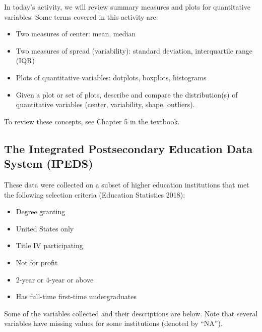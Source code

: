 \documentclass[
]{report}
\begin{document}
In today's activity, we will review summary measures and plots for quantitative variables. Some terms covered in this activity are:

\begin{itemize}
\item
  Two measures of center: mean, median
\item
  Two measures of spread (variability): standard deviation, interquartile range (IQR)
\item
  Plots of quantitative variables: dotplots, boxplots, histograms
\item
  Given a plot or set of plots, describe and compare the distribution(s)
  of quantitative variables
  (center, variability, shape, outliers).
\end{itemize}

To review these concepts, see Chapter 5 in the textbook.

\subsection{The Integrated Postsecondary Education Data System (IPEDS)}\label{the-integrated-postsecondary-education-data-system-ipeds}

These data were collected on a subset of higher education institutions that met the following selection criteria (Education Statistics 2018):

\begin{itemize}
\item
  Degree granting
\item
  United States only
\item
  Title IV participating
\item
  Not for profit
\item
  2-year or 4-year or above
\item
  Has full-time first-time undergraduates
\end{itemize}

Some of the variables collected and their descriptions are below. Note that several variables have missing values for some institutions (denoted by ``NA'').
\end{document}

